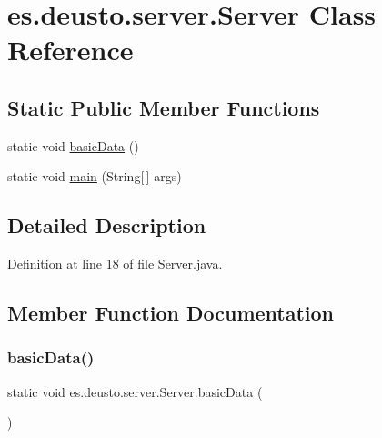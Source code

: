\hypertarget{classes_1_1deusto_1_1server_1_1_server}{}\section{es.\+deusto.\+server.\+Server Class Reference}
\label{classes_1_1deusto_1_1server_1_1_server}
\subsection*{Static Public Member Functions}
\begin{DoxyCompactItemize}
\item 
static void \hyperlink{classes_1_1deusto_1_1server_1_1_server_a6a7efaafdac4e7814e4a15046eeeca26}{basic\+Data} ()
\item 
static void \hyperlink{classes_1_1deusto_1_1server_1_1_server_a750bb0d7dbd89246a3602f2e20d03fb5}{main} (String\mbox{[}$\,$\mbox{]} args)
\end{DoxyCompactItemize}


\subsection{Detailed Description}


Definition at line 18 of file Server.\+java.



\subsection{Member Function Documentation}
\mbox{\label{classes_1_1deusto_1_1server_1_1_server_a6a7efaafdac4e7814e4a15046eeeca26}} 
\subsubsection{\texorpdfstring{basic\+Data()}{basicData()}}
{\footnotesize\ttfamily static void es.\+deusto.\+server.\+Server.\+basic\+Data (\begin{DoxyParamCaption}{ }\end{DoxyParamCaption})\hspace{0.3cm}{\ttfamily [static]}}



